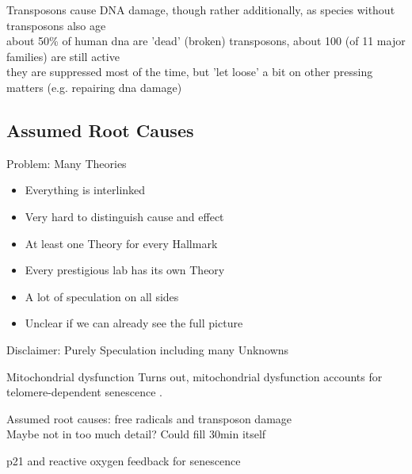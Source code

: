 \begin{frame}[c]{Transposons}
    cause DNA damage, though rather additionally, as species without transposons also age \\
    about 50\% of human dna are 'dead' (broken) transposons, about 100 (of 11 major families) are still active \\
    they are suppressed most of the time, but 'let loose' a bit on other pressing matters (e.g. repairing dna damage)
\end{frame}



\subsection{Assumed Root Causes}

\begin{frame}[c]{Problem: Many Theories}
    \large
    \begin{itemize}[<+(1)->]
        \item Everything is interlinked
        \item Very hard to distinguish cause and effect
        \item At least one Theory for every Hallmark
        \item Every prestigious lab has its own Theory
        \item A lot of speculation on all sides
        \item Unclear if we can already see the full picture
    \end{itemize}
\end{frame}


\addtocounter{framenumber}{1}
\begin{frame}[standout]
    Disclaimer: Purely Speculation including many Unknowns
\end{frame}

\begin{frame}[c]{Mitochondrial dysfunction}
    \large
    Turns out, mitochondrial dysfunction accounts for telomere-dependent senescence \cite{passos2007mitochondrial}.
\end{frame}


\begin{frame}[c]
    \large
    Assumed root causes: free radicals and transposon damage \\
    Maybe not in too much detail? Could fill 30min itself \cite{CorePath13:online} \\
    \pause

    p21 and reactive oxygen feedback for senescence \cite{passos2010feedback}
\end{frame}



